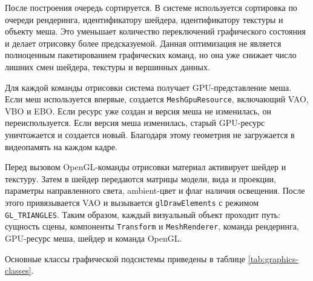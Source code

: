 После построения очередь сортируется. В системе используется сортировка по
очереди рендеринга, идентификатору шейдера, идентификатору текстуры и объекту
меша. Это уменьшает количество переключений графического состояния и делает
отрисовку более предсказуемой. Данная оптимизация не является полноценным
пакетированием графических команд, но она уже снижает число лишних смен
шейдера, текстуры и вершинных данных.

Для каждой команды отрисовки система получает GPU-представление меша.
Если меш используется впервые, создается \texttt{MeshGpuResource}, включающий
VAO, VBO и EBO. Если ресурс уже создан и версия меша не изменилась, он
переиспользуется. Если версия меша изменилась, старый GPU-ресурс уничтожается
и создается новый. Благодаря этому геометрия не загружается в видеопамять на
каждом кадре.

Перед вызовом OpenGL-команды отрисовки материал активирует шейдер и текстуру.
Затем в шейдер передаются матрицы модели, вида и проекции, параметры
направленного света, ambient-цвет и флаг наличия освещения. После этого
привязывается VAO и вызывается \texttt{glDrawElements} с режимом
\texttt{GL\_TRIANGLES}. Таким образом, каждый визуальный объект проходит путь:
сущность сцены, компоненты \texttt{Transform} и \texttt{MeshRenderer}, команда
рендеринга, GPU-ресурс меша, шейдер и команда OpenGL.

Основные классы графической подсистемы приведены в таблице
\ref{tab:graphics-classes}.

\begingroup
\small
\setlength{\tabcolsep}{4pt}
\renewcommand{\arraystretch}{1.2}

